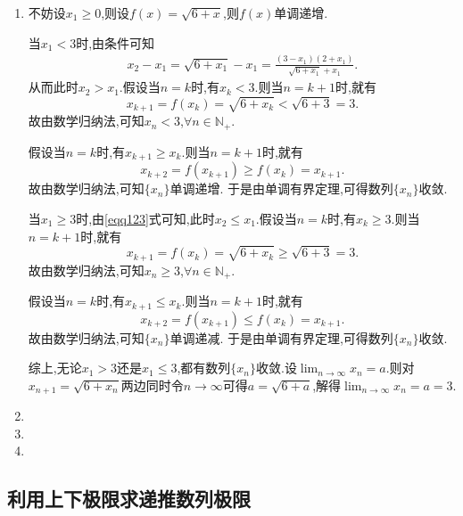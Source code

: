 \documentclass[lang=cn,newtx,10pt,scheme=chinese]{elegantbook}
\begin{document}
\begin{solution}
\begin{enumerate}
   \item 不妨设$x_1\geq 0$,则设\(f(x)=\sqrt{6 + x}\),则\(f(x)\)单调递增.

   当\(x_1 < 3\)时,由条件可知
   \begin{gather}\label{eqq123}
      x_2 - x_1=\sqrt{6 + x_1}-x_1=\frac{(3 - x_1)(2 + x_1)}{\sqrt{6 + x_1}+x_1}.
   \end{gather}
   从而此时\(x_2 > x_1\).假设当\(n = k\)时,有\(x_k < 3\).则当\(n = k + 1\)时,就有
   \[
   x_{k + 1}=f(x_k)=\sqrt{6 + x_k}<\sqrt{6 + 3}=3.
   \]
   故由数学归纳法,可知\(x_n < 3\),\(\forall n\in\mathbb{N}_+\).
   
   假设当\(n = k\)时,有\(x_{k + 1}\geqslant x_k\).则当\(n = k + 1\)时,就有
   \[
   x_{k + 2}=f(x_{k + 1})\geqslant f(x_k)=x_{k + 1}.
   \]
   故由数学归纳法,可知\(\{x_n\}\)单调递增.
   于是由单调有界定理,可得数列\(\{x_n\}\)收敛.
   
   当\(x_1\geqslant 3\)时,由\eqref{eqq123}式可知,此时\(x_2\leqslant x_1\).假设当\(n = k\)时,有\(x_k\geqslant 3\).则当\(n = k + 1\)时,就有
   \[
   x_{k + 1}=f(x_k)=\sqrt{6 + x_k}\geqslant\sqrt{6 + 3}=3.
   \]
   故由数学归纳法,可知\(x_n\geqslant 3\),\(\forall n\in\mathbb{N}_+\).
   
   假设当\(n = k\)时,有\(x_{k + 1}\leqslant x_k\).则当\(n = k + 1\)时,就有
   \[
   x_{k + 2}=f(x_{k + 1})\leqslant f(x_k)=x_{k + 1}.
   \]
   故由数学归纳法,可知\(\{x_n\}\)单调递减.
   于是由单调有界定理,可得数列\(\{x_n\}\)收敛.
   
   综上,无论\(x_1 > 3\)还是\(x_1\leqslant 3\),都有数列\(\{x_n\}\)收敛.设\(\lim_{n\rightarrow\infty}x_n = a\).则对\(x_{n + 1}=\sqrt{6 + x_n}\)两边同时令\(n\rightarrow\infty\)可得\(a=\sqrt{6 + a}\),解得\(\lim_{n\rightarrow\infty}x_n = a = 3\).

   \item 

   \item 

   \item 
\end{enumerate}
\end{solution}

\subsection{利用上下极限求递推数列极限}
\end{document}
